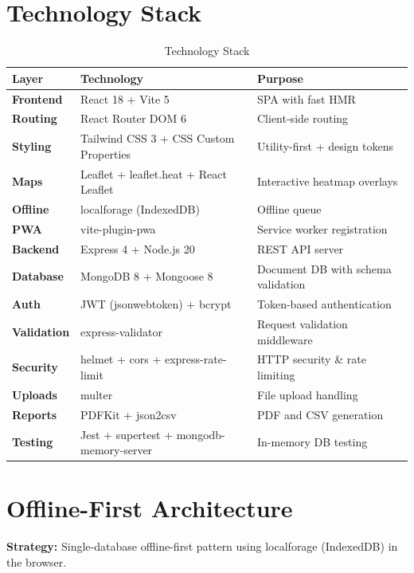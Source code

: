 \section{Technology Stack}
\begin{table}[H]
\centering
\caption{Technology Stack}
\label{tab:tech-stack}
\begin{tabularx}{\textwidth}{@{}lXl@{}}
\toprule
Layer & Technology & Purpose \\
\midrule
\textbf{Frontend} & React 18 + Vite 5 & SPA with fast HMR \\
\textbf{Routing} & React Router DOM 6 & Client-side routing \\
\textbf{Styling} & Tailwind CSS 3 + CSS Custom Properties & Utility-first + design tokens \\
\textbf{Maps} & Leaflet + leaflet.heat + React Leaflet & Interactive heatmap overlays \\
\textbf{Offline} & localforage (IndexedDB) & Offline queue \\
\textbf{PWA} & vite-plugin-pwa & Service worker registration \\
\textbf{Backend} & Express 4 + Node.js 20 & REST API server \\
\textbf{Database} & MongoDB 8 + Mongoose 8 & Document DB with schema validation \\
\textbf{Auth} & JWT (jsonwebtoken) + bcrypt & Token-based authentication \\
\textbf{Validation} & express-validator & Request validation middleware \\
\textbf{Security} & helmet + cors + express-rate-limit & HTTP security \& rate limiting \\
\textbf{Uploads} & multer & File upload handling \\
\textbf{Reports} & PDFKit + json2csv & PDF and CSV generation \\
\textbf{Testing} & Jest + supertest + mongodb-memory-server & In-memory DB testing \\
\bottomrule
\end{tabularx}
\end{table}

\section{Offline-First Architecture}
\textbf{Strategy:} Single-database offline-first pattern using localforage (IndexedDB) in the browser.

